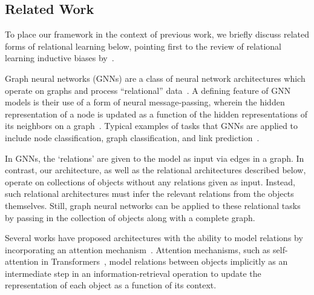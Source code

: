 \subsection{Related Work}\label{ssec:related_work}

To place our framework in the context of previous work, we briefly discuss related forms of relational learning below, pointing first to the review of relational learning inductive biases by~\citet{battagliaRelationalInductiveBiases2018}.

{Graph neural networks} (GNNs) are a class of neural network architectures which operate on graphs and process ``relational'' data~\citep[e.g.,][]{niepertLearningConvolutionalNeural2016,kipfSemiSupervisedClassificationGraph2017,schlichtkrullModelingRelationalData2017,velickovicGraphAttentionNetworks2017,kipfNeuralRelationalInference2018,xuHowPowerfulAre2018}. A defining feature of GNN models is their use of a form of neural message-passing, wherein the hidden representation of a node is updated as a function of the hidden representations of its neighbors on a graph~\citep{gilmerNeuralMessagePassing2017}. Typical examples of tasks that GNNs are applied to include node classification, graph classification, and link prediction~\citep{hamiltonGraphRepresentationLearning2020}. %

In GNNs, the `relations' are given to the model as input via edges in a graph. In contrast, our architecture, as well as the relational architectures described below, operate on collections of objects without any relations given as input. Instead, such relational architectures must infer the relevant relations from the objects themselves. Still, graph neural networks can be applied to these relational tasks by passing in the collection of objects along with a complete graph. %

Several works have proposed architectures with the ability to model relations by incorporating an {attention mechanism}~\citep[e.g.,][]{vaswani2017attention,velickovicGraphAttentionNetworks2017,santoroRelationalRecurrent2018,zambaldiDeepReinforcementLearning2018,locatelloObjectCentricLearningSlot2020}. Attention mechanisms, such as self-attention in Transformers~\citep{vaswani2017attention}, model relations between objects implicitly as an intermediate step in an information-retrieval operation
to update the representation of each object as a function of its context.

